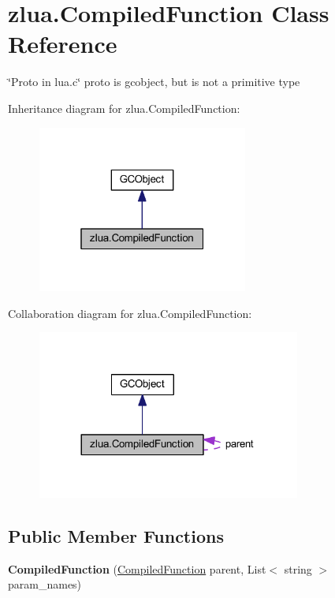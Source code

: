\hypertarget{classzlua_1_1_compiled_function}{}\section{zlua.\+Compiled\+Function Class Reference}
\label{classzlua_1_1_compiled_function}


\char`\"{}\+Proto in lua.\+c\char`\"{} proto is gcobject, but is not a primitive type  




Inheritance diagram for zlua.\+Compiled\+Function\+:
\nopagebreak
\begin{figure}[H]
\begin{center}
\leavevmode
\includegraphics[width=196pt]{classzlua_1_1_compiled_function__inherit__graph}
\end{center}
\end{figure}


Collaboration diagram for zlua.\+Compiled\+Function\+:
\nopagebreak
\begin{figure}[H]
\begin{center}
\leavevmode
\includegraphics[width=245pt]{classzlua_1_1_compiled_function__coll__graph}
\end{center}
\end{figure}
\subsection*{Public Member Functions}
\begin{DoxyCompactItemize}
\item 
\mbox{\label{classzlua_1_1_compiled_function_ab75dd80d0ff208969ee9cd9dd56cd2d6}} 
{\bfseries Compiled\+Function} (\mbox{\hyperlink{classzlua_1_1_compiled_function}{Compiled\+Function}} parent, List$<$ string $>$ param\+\_\+names)
\end{DoxyCompactItemize}
